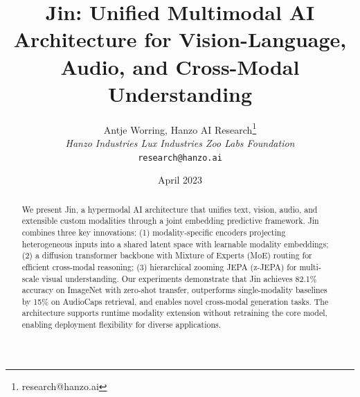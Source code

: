 \documentclass[11pt,twocolumn]{article}
\title{Jin: Unified Multimodal AI Architecture for Vision-Language, Audio, and Cross-Modal Understanding}
\author{Antje Worring, Hanzo AI Research\thanks{research@hanzo.ai} \\ \textit{Hanzo Industries \quad Lux Industries \quad Zoo Labs Foundation} \\ \texttt{research@hanzo.ai}}
\date{April 2023}
\begin{document}
\hanzocoverpage

\begin{abstract}
We present Jin, a hypermodal AI architecture that unifies text, vision, audio, and extensible custom modalities through a joint embedding predictive framework. Jin combines three key innovations: (1) modality-specific encoders projecting heterogeneous inputs into a shared latent space with learnable modality embeddings; (2) a diffusion transformer backbone with Mixture of Experts (MoE) routing for efficient cross-modal reasoning; (3) hierarchical zooming JEPA (z-JEPA) for multi-scale visual understanding. Our experiments demonstrate that Jin achieves 82.1\% accuracy on ImageNet with zero-shot transfer, outperforms single-modality baselines by 15\% on AudioCaps retrieval, and enables novel cross-modal generation tasks. The architecture supports runtime modality extension without retraining the core model, enabling deployment flexibility for diverse applications.
\end{abstract}









\end{document}
